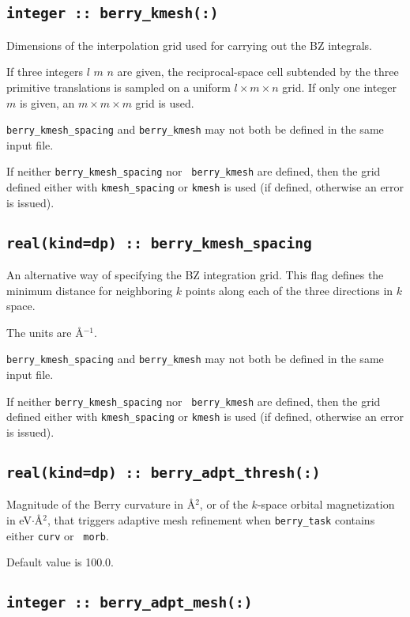 \subsection[berry\_kmesh]{\tt integer :: berry\_kmesh(:)}
Dimensions of the interpolation grid used for carrying out the BZ
integrals.

If three integers $l$ $m$ $n$ are given, the reciprocal-space cell
subtended by the three primitive translations is sampled on a uniform
$l\times m\times n$ grid.  If only one integer $m$ is given, an
$m\times m\times m$ grid is used.

{\tt berry\_kmesh\_spacing} and {\tt berry\_kmesh} may not
both be defined in the same input file.

If neither {\tt berry\_kmesh\_spacing} nor {\tt
  berry\_kmesh} are defined, then the grid defined either with
{\tt kmesh\_spacing} or {\tt kmesh} is used (if defined,
otherwise an error is issued).

\subsection[berry\_kmesh\_spacing]{\tt real(kind=dp) :: berry\_kmesh\_spacing}
An alternative way of specifying the BZ integration grid. This flag
defines the minimum distance for neighboring $k$ points along each of
the three directions in $k$ space.


The units are \AA$^{-1}$.

{\tt berry\_kmesh\_spacing} and {\tt berry\_kmesh} may
not both be defined in the same input file.

If neither {\tt berry\_kmesh\_spacing} nor {\tt
  berry\_kmesh} are defined, then the grid defined either with
{\tt kmesh\_spacing} or {\tt kmesh} is used (if defined,
otherwise an error is issued).


\subsection[berry\_adpt\_thresh]{\tt real(kind=dp) :: berry\_adpt\_thresh(:)}

Magnitude of the Berry curvature in \AA$^2$, or of the $k$-space
orbital magnetization in eV$\cdot$\AA$^2$, that triggers adaptive mesh
refinement when {\tt berry\_task} contains either {\tt curv} or {\tt
  morb}.

Default value is 100.0.

\subsection[berry\_adpt\_mesh]{\tt integer :: berry\_adpt\_mesh(:)}

